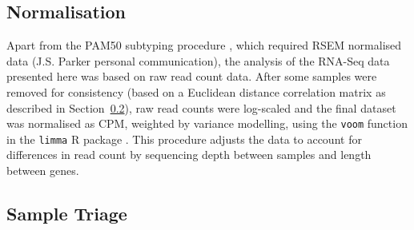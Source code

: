 \subsection{Normalisation}

Apart from the \gls{PAM50} subtyping procedure \citep{Parker2009}, which required \gls{RSEM} normalised data (J.S. Parker personal communication), the analysis of the \gls{RNA-Seq} data presented here was based on raw read count data. After some samples were removed for consistency (based on a Euclidean distance correlation matrix as described in Section~\ref{methods:sample_qc}), raw read counts were log-scaled and the final dataset was %
normalised as \gls{CPM}, weighted by variance modelling, using the \texttt{voom} function \citep{Law2014} in the \texttt{limma} R package \citep{limma}. This procedure adjusts the data to account for differences in read count by sequencing depth between samples and length between genes.

\FloatBarrier

\subsection{Sample Triage} \label{methods:sample_qc}

